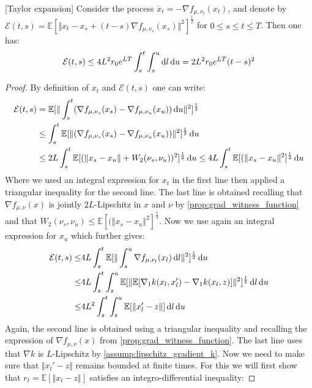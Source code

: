 \begin{lemma}\label{lem:Taylor-expansion}[Taylor expansion]
	Consider the process $ \dot{x}_t = - \nabla f_{\mu,\nu_t}(x_t) $, and denote by $\mathcal{E}(t,s) = \mathbb{E}[ \Vert x_t - x_s +(t-s)\nabla f_{\mu,\nu_s}(x_s) \Vert ^2 ]^{\frac{1}{2}} $ for $0\leq s \leq t \leq T$. Then one has:
	\begin{align}
		\mathcal{E}(t,s)\leq 4L^2 r_0 e^{LT} \int_{s}^t \int_s^u \mathop{}\!\mathrm{d} l \mathop{}\!\mathrm{d} u = 2L^2 r_0 e^{LT}(t-s)^2
	\end{align}
\end{lemma}
\begin{proof}
	By definition of $x_t$ and $\mathcal{E}(t,s)$ one can write:
	\begin{align*}
		\mathcal{E}(t,s) 
		&=
		\mathbb{E}[\Vert \int_{s}^t (\nabla f_{\mu,\nu_s}(x_s) - \nabla f_{\mu,\nu_u}(x_u))\mathop{}\!\mathrm{d} u  \Vert^2 ]^{\frac{1}{2}} \\
		&\leq
		\int_{s}^t  \mathbb{E}[\Vert (\nabla f_{\mu,\nu_s}(x_s) - \nabla f_{\mu,\nu_u}(x_u))  \Vert^2 ]^{\frac{1}{2}} \mathop{}\!\mathrm{d} u\\
		&\leq
		2L\int_{s}^t  \mathbb{E}[(\Vert  x_s - x_u \Vert + W_2(\nu_s,\nu_u))^2 ]^{\frac{1}{2}} \mathop{}\!\mathrm{d} u \leq 4L\int_{s}^t   \mathbb{E}[(\Vert  x_s - x_u \Vert^2]^{\frac{1}{2}}\mathop{}\!\mathrm{d} u
	\end{align*}
	Where we used an integral expression for $x_t$ in the first line then applied a triangular inequality for the second line. The last line is obtained recalling that $\nabla f_{\mu,\nu}(x)$ is jointly $2L$-Lipschitz in $x$ and $\nu$ by \cref{prop:grad_witness_function} and that $W_2(\nu_s,\nu_u) \leq \mathbb{E}[(\Vert  x_s - x_u \Vert^2]^{\frac{1}{2}}$. Now we use again an integral expression for $x_u$ which further gives:
	\begin{align*}
		\mathcal{E}(t,s) \leq & 4L \int_{s}^t \mathbb{E}[\Vert \int_s^u  \nabla f_{\mu,\nu_l}(x_l) \mathop{}\!\mathrm{d} l \Vert^2 ]^{\frac{1}{2}}\mathop{}\!\mathrm{d} u\\
		\leq & 4L \int_{s}^t \int_s^u  \mathbb{E}[ \Vert \mathbb{E}[ \nabla_1 k(x_l,x_l') - \nabla_1 k(x_l,z) ]   \Vert^2  ]^\frac{1}{2}\mathop{}\!\mathrm{d} l\mathop{}\!\mathrm{d} u\\
		\leq &
		4L^2 \int_{s}^t \int_s^u   \mathbb{E}[\Vert x_l' - z \Vert] \mathop{}\!\mathrm{d} l \mathop{}\!\mathrm{d} u
	\end{align*}
	Again, the second line is obtained using a triangular inequality and recalling the expression of $\nabla f_{\mu,\nu}(x)$ from \cref{prop:grad_witness_function}. The last line uses that $\nabla k$ is $L$-Lipschitz by \cref{assump:lipschitz_gradient_k}. Now we need to make sure that $\Vert x_l' - z \Vert$ remains bounded at finite times. For this we will first show that $ r_t = \mathbb{E}[\Vert x_t - z \Vert]$ satisfies an integro-differential inequality: 

\end{proof}
